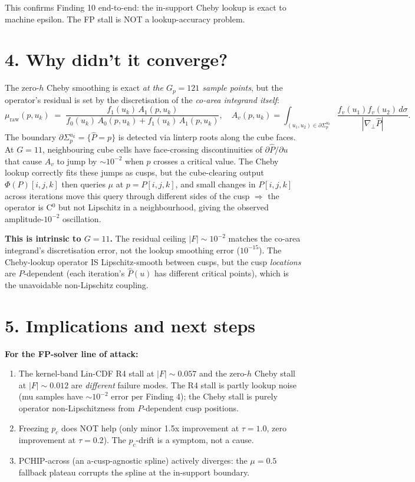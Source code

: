 \documentclass[10pt,a4paper]{article}
\begin{document}
This confirms Finding 10 end-to-end: the in-support Cheby lookup is exact
to machine epsilon. The FP stall is NOT a lookup-accuracy problem.

\section*{4. Why didn't it converge?}

The zero-$h$ Cheby smoothing is exact \emph{at the $G_p{=}121$ sample
points}, but the operator's residual is set by the discretisation of the
\emph{co-area integrand itself}:
\[
\mu_\text{raw}(p,u_k) \;=\; \frac{f_1(u_k)\,A_1(p,u_k)}
                                {f_0(u_k)\,A_0(p,u_k) + f_1(u_k)\,A_1(p,u_k)},
\quad
A_v(p,u_k) = \int_{(u_1,u_2)\in\partial\Sigma_p^{u_k}}
\frac{f_v(u_1)f_v(u_2)\,d\sigma}{|\nabla_\bot \hat P|}.
\]
The boundary $\partial\Sigma_p^{u_k}{=}\{\hat P{=}p\}$ is detected via
linterp roots along the cube faces. At $G{=}11$, neighbouring cube cells
have face-crossing discontinuities of $\partial\hat P/\partial u$ that
cause $A_v$ to jump by ${\sim}10^{-2}$ when $p$ crosses a critical value.
The Cheby lookup correctly fits these jumps as cusps, but the cube-clearing
output $\Phi(P)[i,j,k]$ then queries $\mu$ at $p{=}P[i,j,k]$, and small
changes in $P[i,j,k]$ across iterations move this query through different
sides of the cusp $\Rightarrow$ the operator is C$^0$ but not Lipschitz
in a neighbourhood, giving the observed amplitude-$10^{-2}$ oscillation.

\textbf{This is intrinsic to $G{=}11$.} The residual ceiling
$|F|\!\sim\!10^{-2}$ matches the co-area integrand's discretisation error,
not the lookup smoothing error ($10^{-15}$). The Cheby-lookup operator IS
Lipschitz-smooth between cusps, but the cusp \emph{locations} are
$P$-dependent (each iteration's $\hat P(u)$ has different critical points),
which is the unavoidable non-Lipschitz coupling.

\section*{5. Implications and next steps}

\textbf{For the FP-solver line of attack:}
\begin{enumerate}\setlength{\itemsep}{0pt}
\item The kernel-band Lin-CDF R4 stall at $|F|\!\sim\!0.057$ and the
  zero-$h$ Cheby stall at $|F|\!\sim\!0.012$ are \emph{different} failure
  modes. The R4 stall is partly lookup noise (mu samples have $\sim 10^{-2}$
  error per Finding 4); the Cheby stall is purely operator non-Lipschitzness
  from $P$-dependent cusp positions.
\item Freezing $p_c$ does NOT help (only minor 1.5x improvement at $\tau{=}1.0$,
  zero improvement at $\tau{=}0.2$). The $p_c$-drift is a symptom, not a cause.
\item PCHIP-across (an a-cusp-agnostic spline) actively diverges: the
  $\mu{=}0.5$ fallback plateau corrupts the spline at the in-support boundary.
\end{enumerate}
\end{document}
